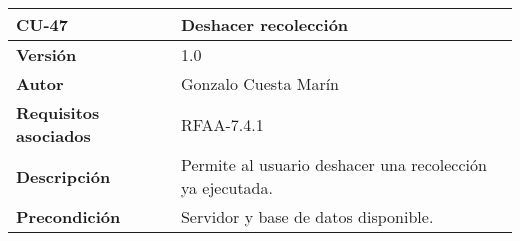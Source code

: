 \begin{longtable}[]{@{}ll@{}}
\toprule
\begin{minipage}[b]{0.25\columnwidth}\raggedright
\textbf{CU-47}\strut
\end{minipage} & \begin{minipage}[b]{0.69\columnwidth}\raggedright
\textbf{Deshacer recolección}\strut
\end{minipage}\tabularnewline
\midrule
\endhead
\begin{minipage}[t]{0.25\columnwidth}\raggedright
\textbf{Versión}\strut
\end{minipage} & \begin{minipage}[t]{0.69\columnwidth}\raggedright
1.0\strut
\end{minipage}\tabularnewline
\begin{minipage}[t]{0.25\columnwidth}\raggedright
\textbf{Autor}\strut
\end{minipage} & \begin{minipage}[t]{0.69\columnwidth}\raggedright
Gonzalo Cuesta Marín\strut
\end{minipage}\tabularnewline
\begin{minipage}[t]{0.25\columnwidth}\raggedright
\textbf{Requisitos asociados}\strut
\end{minipage} & \begin{minipage}[t]{0.69\columnwidth}\raggedright
RFAA-7.4.1\strut
\end{minipage}\tabularnewline
\begin{minipage}[t]{0.25\columnwidth}\raggedright
\textbf{Descripción}\strut
\end{minipage} & \begin{minipage}[t]{0.69\columnwidth}\raggedright
Permite al usuario deshacer una recolección ya ejecutada.\strut
\end{minipage}\tabularnewline
\begin{minipage}[t]{0.25\columnwidth}\raggedright
\textbf{Precondición}\strut
\end{minipage} & \begin{minipage}[t]{0.69\columnwidth}\raggedright
Servidor y base de datos disponible.


\end{minipage}
\end{longtable}
